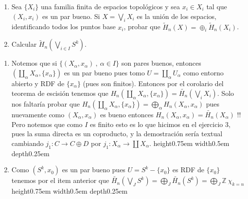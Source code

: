 \documentclass[11pt,a4paper,oneside]{article}
\newcommand{\sett}[1]{\{#1\}}
\newcommand{\Z}{\mathbb{Z}}
\newenvironment{proof}[1][Demostraci\'on]{\begin{trivlist}
\item[\hskip \labelsep {\bfseries #1}]}{\end{trivlist}}
\newcommand{\qed}{\nobreak \ifvmode \relax \else
      \ifdim\lastskip<1.5em \hskip-\lastskip
      \hskip1.5em plus0em minus0.5em \fi \nobreak
      \vrule height0.75em width0.5em depth0.25em\fi}
\begin{document}
\begin{enumerate}

\item
\begin{enumerate}
\item
Sea $\{X_i\}$ una familia finita de espacios topol\'ogicos y sea $x_i\in
X_i$ tal que $(X_i,x_i)$ es un par bueno.
Si $X=\bigvee_i X_i$ es la uni\'on de los espacios, identificando
todos los puntos base $x_i$, probar que $\tilde
H_n(X)=\oplus_i\tilde H_n(X_i)$.


\item
Calcular $\displaystyle \tilde H_n(\bigvee_{i\in I}S^k)$.
\end{enumerate}


\begin{proof}

\begin{enumerate}

\item 

Notemos que si $\sett{(X_\alpha,x_\alpha) \ , \ \alpha \in I}$ son pares buenos, entonces $(\coprod_{\alpha}{X_{\alpha}},\sett{x_{\alpha}})$
 es un par bueno pues tomo $U = \coprod_{\alpha}{U_{\alpha}}$ como entorno abierto y RDF de $\sett{x_{\alpha}}$ (pues son finitos). Entonces por el corolario del teorema de escisi\'on tenemos que $H_n(\coprod_{\alpha}{X_{\alpha}},\sett{x_{\alpha}}) = \widetilde{H_n}(\bigvee_{i}{X_i})$. Solo nos faltar\'ia probar que $H_n(\coprod_{\alpha}{X_{\alpha}},\sett{x_{\alpha}}) = \bigoplus_{\alpha}{H_n(X_{\alpha},x_{\alpha})}$ pues nuevamente como $(X_{\alpha},x_{\alpha})$ es bueno entonces $H_n(X_{\alpha},x_{\alpha}) = \widetilde{H_n}(X_{\alpha})$ !! Pero notemos que como $I$ es finito esto es lo que hicimos en el ejercicio 3, pues la suma directa es un coproducto, y la demostraci\'on ser\'ia textual cambiando $j_1 : C \rightarrow C \oplus D$ por $j_1 : X_{\alpha} \rightarrow \coprod X_{\alpha}$. \qed
 
 
\item Como $(S^k,x_0)$ es un par bueno pues $U = S^k - \sett{x_0}$ es RDF de $\sett{x_0}$ tenemos por el item anterior que $\widetilde{H_n}(\bigvee_{J} {S^k}) = \bigoplus_{J} {\widetilde{H_n}(S^k)} = \bigoplus_{J} \Z \ \chi_{k = n}$ \qed

\end{enumerate}

\end{proof}









\end{enumerate}
\end{document}
